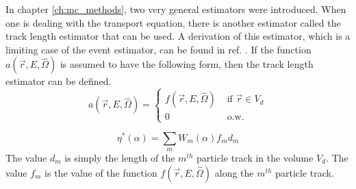 In chapter \ref{ch:mc_methods}, two very general estimators were introduced.
When one is dealing with the transport equation, there is another estimator 
called the track length estimator that can be used. A derivation of this 
estimator, which is a limiting case of the event estimator, can be found in ref.
\citep{spanier_monte_1969}. If the function $a(\vec{r},E,\hat{\Omega})$ is 
assumed to have the following form, then the track length estimator can be 
defined. 
\begin{equation*}
  a(\vec{r},E,\hat{\Omega}) = 
  \begin{cases}
    f(\vec{r},E,\hat{\Omega}) & \text{ if } \vec{r} \in V_d \\
    0 & \text{ o.w.}
  \end{cases}
\end{equation*}

\begin{equation}
  \eta^{*}(\alpha) = \sum_m W_m(\alpha)f_md_m
\end{equation}
The value $d_m$ is simply the length of the $m^{th}$ particle track in the 
volume $V_d$. The value $f_m$ is the value of the function 
$f(\vec{r},E,\hat{\Omega})$ along the $m^{th}$ particle track. 
